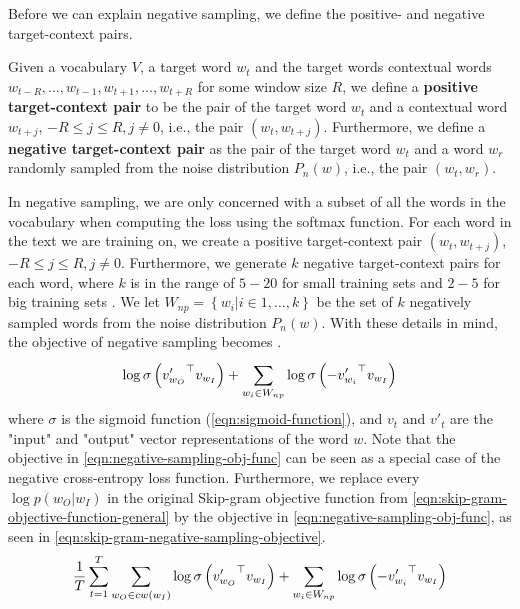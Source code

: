 Before we can explain negative sampling, we define the positive- and negative target-context pairs.
\begin{definition}
Given a vocabulary $V$, a target word $w_t$ and the target words contextual words $w_{t-R}, \ldots, w_{t-1}, w_{t+1}, \ldots, w_{t+R}$ for some window size $R$, we define a \textbf{positive target-context pair} to be the pair of the target word $w_t$ and a contextual word $w_{t+j}$, $-R \leq j \leq R, j \neq 0$, i.e., the pair $\left( w_t, w_{t+j} \right)$. Furthermore, we define a \textbf{negative target-context pair} as the pair of the target word $w_t$ and a word $w_r$ randomly sampled from the noise distribution $P_n(w)$, i.e., the pair $\left( w_t, w_r \right)$.
\end{definition}

In negative sampling, we are only concerned with a subset of all the words in the vocabulary when computing the loss using the softmax function. For each word in the text we are training on, we create a positive target-context pair $\left( w_t, w_{t+j} \right)$, $-R \leq j \leq R, j \neq 0$. Furthermore, we generate $k$ negative target-context pairs for each word, where $k$ is in the range of $5-20$ for small training sets and $2-5$ for big training sets \cite{mikolov2013b}. We let $W_{np} = \left \{ w_i | i \in 1, \ldots, k \right \}$ be the set of $k$ negatively sampled words from the noise distribution $P_n(w)$. With these details in mind, the objective of negative sampling becomes \cite{mikolov2013b, rong2016word2vec}.
\begin{align}
    \log \sigma \left( {v'_{w_O}}^\top v_{w_I} \right) + \sum\limits_{w_i \in W_{np}}^{} \log \sigma \left( -{v'_{w_i}}^\top v_{w_I} \right)
    \label{eqn:negative-sampling-obj-func}
\end{align}
where $\sigma$ is the sigmoid function (\cref{eqn:sigmoid-function}), and $v_t$ and $v'_t$ are the "input" and "output" vector representations of the word $w$. Note that the objective in \cref{eqn:negative-sampling-obj-func} can be seen as a special case of the negative cross-entropy loss function. Furthermore, we replace every $\log p(w_O | w_I)$ in the original Skip-gram objective function from \cref{eqn:skip-gram-objective-function-general} by the objective in \cref{eqn:negative-sampling-obj-func}, as seen in \cref{eqn:skip-gram-negative-sampling-objective}.
\begin{align}
    \frac{1}{T} \sum\limits_{t=1}^{T} \sum\limits_{w_O \in cw(w_I)}^{} \log \sigma \left( {v'_{w_O}}^\top v_{w_I} \right) + \sum\limits_{w_i \in W_{np}}^{} \log \sigma \left( -{v'_{w_i}}^\top v_{w_I} \right)
    \label{eqn:skip-gram-negative-sampling-objective}
\end{align}

